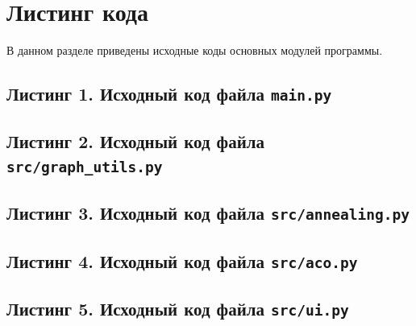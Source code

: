 \documentclass[12pt,a4paper]{article}
\begin{document}
\section{Листинг кода}
В данном разделе приведены исходные коды основных модулей программы.

\subsection*{Листинг 1. Исходный код файла \texttt{main.py}}

\subsection*{Листинг 2. Исходный код файла \texttt{src/graph\_utils.py}}

\subsection*{Листинг 3. Исходный код файла \texttt{src/annealing.py}}

\subsection*{Листинг 4. Исходный код файла \texttt{src/aco.py}}

\subsection*{Листинг 5. Исходный код файла \texttt{src/ui.py}}
\end{document}
